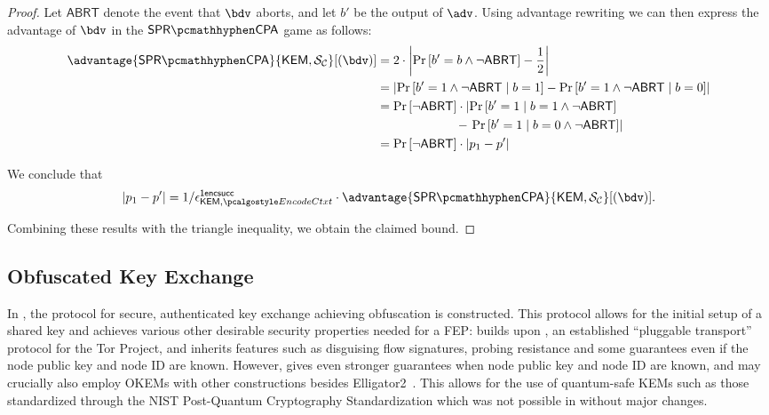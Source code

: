 \begin{proof}
    Let $\mathsf{ABRT}$ denote the event that $\bdv$ aborts, and let $b'$ be the output of $\adv$. Using advantage rewriting we can then express the advantage of $\bdv$ in the $\sprcpa$ game as follows:
    \begin{align*}
        \advantage{\sprcpa}{\KEM, \simulunif}[(\bdv)]
        &=
        2 \cdot \left|
            \Pr\left[b'=b \land \neg \mathsf{ABRT} \right] - \frac{1}{2}
        \right| \\
        &=
        \left|
            \Pr\left[b'=1 \land \neg \mathsf{ABRT} \mid b=1 \right] - \Pr\left[b'=1 \land \neg \mathsf{ABRT} \mid b=0 \right]
        \right| \\
        &=
        \Pr\left[\neg \mathsf{ABRT}\right] \cdot
        \left|
            \Pr\left[b'=1 \mid b=1 \land \neg \mathsf{ABRT} \right]
        \right.\\   
        &\qquad\qquad\qquad\  - \left.
            \Pr\left[b'=1 \mid b=0 \land \neg \mathsf{ABRT} \right]
        \right| \\
        &=
        \Pr\left[\neg \mathsf{ABRT}\right] \cdot
        \left|
            p_1 - p'
        \right|
    \end{align*}

    We conclude that
    \[
    \left| p_1 - p' \right| = 1/\epsilon^\firstencapssuccess_{\KEM,\encodectxt} \cdot \advantage{\sprcpa}{\KEM, \simulunif}[(\bdv)].
    \]
    
    Combining these results with the triangle inequality, we obtain the claimed bound.
\end{proof}

\subsection{Obfuscated Key Exchange}

In \cite{CCS:GunSteVei24}, the \pqobfs{} protocol for secure, authenticated key exchange achieving obfuscation is constructed. This protocol allows for the initial setup of a shared key and achieves various other desirable security properties needed for a FEP:
\pqobfs{} builds upon \obfsfour{} \cite{obfs4}, an established ``pluggable transport'' protocol for the Tor Project, and \pqobfs{} inherits features such as disguising flow signatures, probing resistance and some guarantees even if the node public key and node ID are known.
However, \pqobfs{} gives even stronger guarantees when node public key and node ID are known, and may crucially also employ OKEMs with other constructions besides \textsf{Elligator2}~\cite{CCS:BHKL13}. This allows for the use of quantum-safe KEMs such as those standardized through the NIST Post-Quantum Cryptography Standardization \cite{nist-standardization} which was not possible in \obfsfour{} without major changes.

